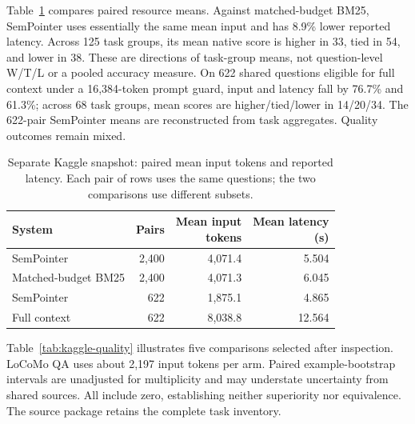 \documentclass[pdflatex,sn-mathphys-num]{sn-jnl}
\begin{document}
Table~\ref{tab:kaggle} compares paired resource means. Against matched-budget BM25, SemPointer uses essentially the same mean input and has 8.9\% lower reported latency. Across 125 task groups, its mean native score is higher in 33, tied in 54, and lower in 38. These are directions of task-group means, not question-level W/T/L or a pooled accuracy measure. On 622 shared questions eligible for full context under a 16,384-token prompt guard, input and latency fall by 76.7\% and 61.3\%; across 68 task groups, mean scores are higher/tied/lower in 14/20/34. The 622-pair SemPointer means are reconstructed from task aggregates. Quality outcomes remain mixed.

\begingroup
\renewcommand{\tablebodyfont}{\normalsize}
\renewcommand{\tablecaptionfont}{\small}
\begin{table}[!htbp]\centering
\caption{Separate Kaggle snapshot: paired mean input tokens and reported latency. Each pair of rows uses the same questions; the two comparisons use different subsets.}\label{tab:kaggle}
\begin{tabular*}{\linewidth}{@{\extracolsep{\fill}}lrrr@{}}\toprule
System & Pairs & \shortstack{Mean input\\tokens} & \shortstack{Mean latency\\(s)} \\
\midrule
SemPointer & 2,400 & 4,071.4 & 5.504 \\
Matched-budget BM25 & 2,400 & 4,071.3 & 6.045 \\
\midrule
SemPointer & 622 & 1,875.1 & 4.865 \\
Full context & 622 & 8,038.8 & 12.564 \\
\bottomrule\end{tabular*}\end{table}
\endgroup

Table~\ref{tab:kaggle-quality} illustrates five comparisons selected after inspection. LoCoMo QA uses about 2,197 input tokens per arm. Paired example-bootstrap intervals are unadjusted for multiplicity and may understate uncertainty from shared sources. All include zero, establishing neither superiority nor equivalence. The source package retains the complete task inventory.
\end{document}
